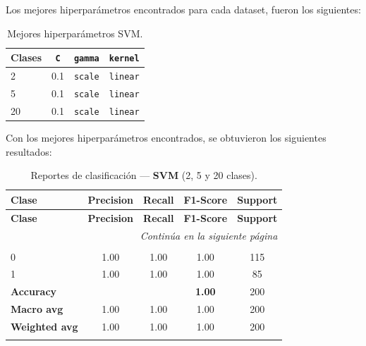 \documentclass[12pt,a4paper]{article}
\begin{document}
\begin{enumerate}
  Los mejores hiperparámetros encontrados para cada dataset, fueron los siguientes:

  \begin{table}[htbp]
    \centering
    \begin{tabular}{@{}lccc@{}}
      \toprule
      \textbf{Clases} & \texttt{C} & \texttt{gamma} & \texttt{kernel} \\
      \midrule
      2  & 0.1 & \texttt{scale} & \texttt{linear} \\
      5  & 0.1 & \texttt{scale} & \texttt{linear} \\
      20 & 0.1 & \texttt{scale} & \texttt{linear} \\
      \bottomrule
    \end{tabular}
    \caption{Mejores hiperparámetros SVM.}
    \label{tab:best_hparams_svm}
  \end{table}
  
  Con los mejores hiperparámetros encontrados, se obtuvieron los siguientes resultados:

  \small
  \setlength{\tabcolsep}{4pt}
  \begin{longtable}{@{}lcccc@{}}
    \toprule
    \textbf{Clase} & \textbf{Precision} & \textbf{Recall} & \textbf{F1-Score} & \textbf{Support} \\
    \midrule
    \endfirsthead

    \toprule
    \textbf{Clase} & \textbf{Precision} & \textbf{Recall} & \textbf{F1-Score} & \textbf{Support} \\
    \midrule
    \endhead

    \midrule
    \multicolumn{5}{r}{\emph{Continúa en la siguiente página}} \\
    \endfoot

    \bottomrule
    \caption{Reportes de clasificación — \textbf{SVM} (2, 5 y 20 clases).}
    \label{tab:reportes_clasificacion_svm}
    \endlastfoot

    \multicolumn{5}{@{}l}{\textbf{(a) 2 clases}}\\
    0 & 1.00 & 1.00 & 1.00 & 115 \\
    1 & 1.00 & 1.00 & 1.00 & 85 \\
    \midrule
    \multicolumn{3}{l}{\textbf{Accuracy}} & \textbf{1.00} & 200 \\
    \textbf{Macro avg}    & 1.00 & 1.00 & 1.00 & 200 \\
    \textbf{Weighted avg} & 1.00 & 1.00 & 1.00 & 200 \\
    \addlinespace[0.8em]


\end{longtable}
\end{enumerate}
\end{document}
